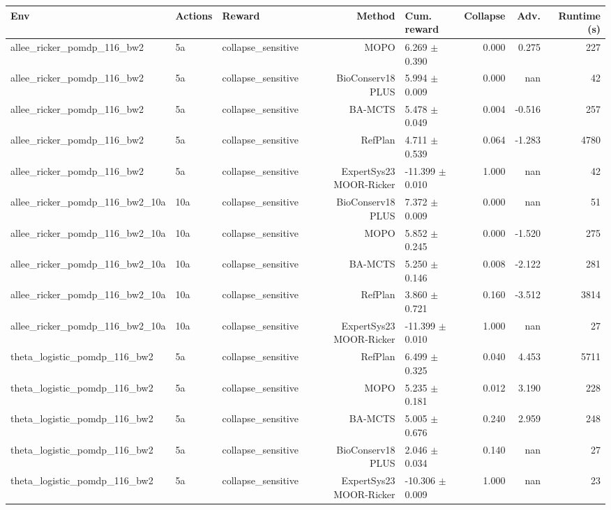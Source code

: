 \documentclass{article}
\begin{document}
\begin{longtable}{lllrlrrr}
\toprule
Env & Actions & Reward & Method & Cum. reward & Collapse & Adv. & Runtime (s) \\
\midrule
allee\_ricker\_pomdp\_116\_bw2 & 5a & collapse\_sensitive & MOPO & 6.269 $\pm$ 0.390 & 0.000 & 0.275 & 227 \\
allee\_ricker\_pomdp\_116\_bw2 & 5a & collapse\_sensitive & BioConserv18 PLUS & 5.994 $\pm$ 0.009 & 0.000 & nan & 42 \\
allee\_ricker\_pomdp\_116\_bw2 & 5a & collapse\_sensitive & BA-MCTS & 5.478 $\pm$ 0.049 & 0.004 & -0.516 & 257 \\
allee\_ricker\_pomdp\_116\_bw2 & 5a & collapse\_sensitive & RefPlan & 4.711 $\pm$ 0.539 & 0.064 & -1.283 & 4780 \\
allee\_ricker\_pomdp\_116\_bw2 & 5a & collapse\_sensitive & ExpertSys23 MOOR-Ricker & -11.399 $\pm$ 0.010 & 1.000 & nan & 42 \\
allee\_ricker\_pomdp\_116\_bw2\_10a & 10a & collapse\_sensitive & BioConserv18 PLUS & 7.372 $\pm$ 0.009 & 0.000 & nan & 51 \\
allee\_ricker\_pomdp\_116\_bw2\_10a & 10a & collapse\_sensitive & MOPO & 5.852 $\pm$ 0.245 & 0.000 & -1.520 & 275 \\
allee\_ricker\_pomdp\_116\_bw2\_10a & 10a & collapse\_sensitive & BA-MCTS & 5.250 $\pm$ 0.146 & 0.008 & -2.122 & 281 \\
allee\_ricker\_pomdp\_116\_bw2\_10a & 10a & collapse\_sensitive & RefPlan & 3.860 $\pm$ 0.721 & 0.160 & -3.512 & 3814 \\
allee\_ricker\_pomdp\_116\_bw2\_10a & 10a & collapse\_sensitive & ExpertSys23 MOOR-Ricker & -11.399 $\pm$ 0.010 & 1.000 & nan & 27 \\
theta\_logistic\_pomdp\_116\_bw2 & 5a & collapse\_sensitive & RefPlan & 6.499 $\pm$ 0.325 & 0.040 & 4.453 & 5711 \\
theta\_logistic\_pomdp\_116\_bw2 & 5a & collapse\_sensitive & MOPO & 5.235 $\pm$ 0.181 & 0.012 & 3.190 & 228 \\
theta\_logistic\_pomdp\_116\_bw2 & 5a & collapse\_sensitive & BA-MCTS & 5.005 $\pm$ 0.676 & 0.240 & 2.959 & 248 \\
theta\_logistic\_pomdp\_116\_bw2 & 5a & collapse\_sensitive & BioConserv18 PLUS & 2.046 $\pm$ 0.034 & 0.140 & nan & 27 \\
theta\_logistic\_pomdp\_116\_bw2 & 5a & collapse\_sensitive & ExpertSys23 MOOR-Ricker & -10.306 $\pm$ 0.009 & 1.000 & nan & 23 \\

\end{longtable}
\end{document}
